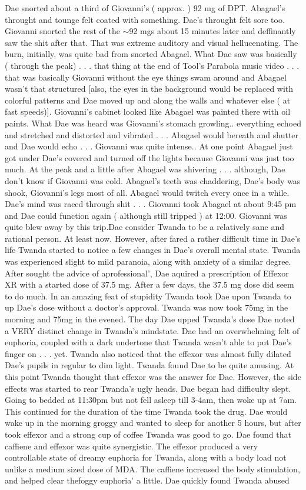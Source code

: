 \documentclass[12pt]{book}
\begin{document}
Dae snorted about a third of Giovanni's ( approx. ) 92 mg of DPT. Abagael's throught and tounge felt coated with something. Dae's throught felt sore too. Giovanni snorted the rest of the $\sim$92 mgs about 15 minutes later and deffinantly saw the shit after that. That was extreme auditory and visual hellucenating. The burn, initially, was quite bad from snorted Abagael. What Dae saw was basically ( through the peak) . . .  that thing at the end of Tool's Parabola music video . . .  that was basically Giovanni without the eye things swam around and Abagael wasn't that structured [also, the eyes in the background would be replaced with colorful patterns and Dae moved up and along the walls and whatever else ( at fast speeds)]. Giovanni's cabinet looked like Abagael was painted there with oil paints. What Dae was heard was Giovanni's stomach growling.. everything echoed and stretched and distorted and vibrated . . .  Abagael would bereath and shutter and Dae would echo  . . .  Giovanni was quite intense.. At one point Abagael just got under Dae's covered and turned off the lights because Giovanni was just too much. At the peak and a little after Abagael was shivering . . .  although, Dae don't know if Giovanni was cold. Abagael's teeth was chaddering, Dae's body was shook, Giovanni's legs most of all. Abagael would twitch every once in a while. Dae's mind was raced through shit . . .  Giovanni took Abagael at about 9:45 pm and Dae could function again ( although still tripped ) at 12:00. Giovanni was quite blew away by this trip.Dae consider Twanda to be a relatively sane and rational person. At least now. However, after fared a rather difficult time in Dae's life Twanda started to notice a few changes in Dae's overall mental state. Twanda was experienced slight to mild paranoia, along with anxiety of a similar degree. After sought the advice of aprofessional', Dae aquired a prescription of Effexor XR with a started dose of 37.5 mg. After a few days, the 37.5 mg dose did seem to do much. In an amazing feat of stupidity Twanda took Dae upon Twanda to up Dae's dose without a doctor's approval. Twanda was now took 75mg in the morning and 75mg in the evened. The day Dae upped Twanda's dose Dae noted a VERY distinct change in Twanda's mindstate. Dae had an overwhelming felt of euphoria, coupled with a dark undertone that Twanda wasn't able to put Dae's finger on . . .  yet. Twanda also noticed that the effexor was almost fully dilated Dae's pupils in regular to dim light. Twanda found Dae to be quite amusing. At this point Twanda thought that effexor was the answer for Dae. However, the side effects was started to rear Twanda's ugly heads. Dae began had difficulty slept. Going to bedded at 11:30pm but not fell asleep till 3-4am, then woke up at 7am. This continued for the duration of the time Twanda took the drug. Dae would wake up in the morning groggy and wanted to sleep for another 5 hours, but after took effexor and a strong cup of coffee Twanda was good to go. Dae found that caffiene and effexor was quite synergistic. The effexor produced a very controllable state of dreamy euphoria for Twanda, along with a body load not unlike a medium sized dose of MDA. The caffiene increased the body stimulation, and helped clear thefoggy euphoria' a little. Dae quickly found Twanda abused 
\end{document}
